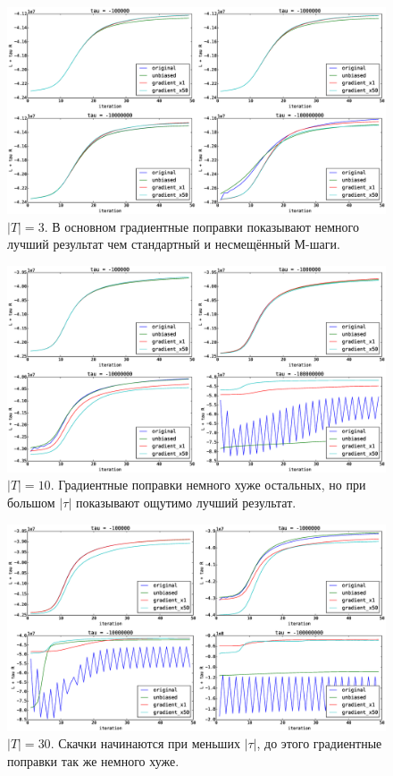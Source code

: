 \documentclass[12pt]{article}
\begin{document}
\begin{figure}[H]
	\centering
	\caption{$|T| = 3$. В основном градиентные поправки показывают немного лучший результат чем стандартный и несмещённый М-шаги. }   
	\medskip   
	\includegraphics[width=1.0\linewidth]{pictures/topics_3_LR_values}
\end{figure}
\begin{figure}[H]
	\centering
	\caption{$|T| = 10$. Градиентные поправки немного хуже остальных, но при большом $|\tau|$ показывают ощутимо лучший результат.}      
	\medskip
	\includegraphics[width=1.0\linewidth]{pictures/topics_10_LR_values}
\end{figure}
\begin{figure}[H]
	\centering
	\caption{$|T| = 30$. Скачки начинаются при меньших $|\tau|$, до этого градиентные поправки так же немного хуже.}      
	\medskip
	\includegraphics[width=1.0\linewidth]{pictures/topics_30_LR_values}
\end{figure}
\end{document}
